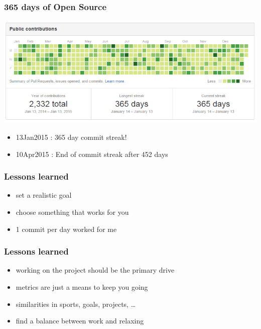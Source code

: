 \documentclass[14pt]{beamer}
\begin{document}
  \begin{frame}
    \frametitle{365 days of Open Source}
    \includegraphics[scale=.45]{github_oss365_13jan2015.png}
    \begin{itemize}
      \item 13Jan2015 : 365 day commit streak!
      \item 10Apr2015 : End of commit streak after 452 days
    \end{itemize}
  \end{frame}
  \begin{frame}
    \frametitle{Lessons learned}
    \begin{itemize}
      \item set a realistic goal
      \item choose something that works for you
      \item 1 commit per day worked for me
    \end{itemize}
  \end{frame}
  \begin{frame}
    \frametitle{Lessons learned}
    \begin{itemize}
      \item working on the project should be the primary drive
      \item metrics are just a means to keep you going
      \item similarities in sports, goals, projects, \ldots
      \item find a balance between work and relaxing
    \end{itemize}
  \end{frame}
\end{document}
